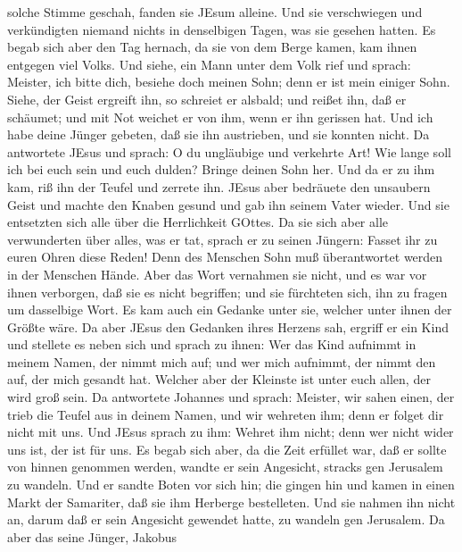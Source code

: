 solche Stimme geschah, fanden sie JEsum alleine. Und sie verschwiegen
und verkündigten niemand nichts in denselbigen Tagen, was sie gesehen
hatten.  Es begab sich aber den Tag hernach, da sie von dem
Berge kamen, kam ihnen entgegen viel Volks.  Und siehe, ein
Mann unter dem Volk rief und sprach: Meister, ich bitte dich, besiehe
doch meinen Sohn; denn er ist mein einiger Sohn.  Siehe,
der Geist ergreift ihn, so schreiet er alsbald; und reißet ihn, daß er
schäumet; und mit Not weichet er von ihm, wenn er ihn gerissen hat.
 Und ich habe deine Jünger gebeten, daß sie ihn austrieben,
und sie konnten nicht.  Da antwortete JEsus und sprach: O
du ungläubige und verkehrte Art! Wie lange soll ich bei euch sein und
euch dulden? Bringe deinen Sohn her.  Und da er zu ihm kam,
riß ihn der Teufel und zerrete ihn. JEsus aber bedräuete den unsaubern
Geist und machte den Knaben gesund und gab ihn seinem Vater wieder.
 Und sie entsetzten sich alle über die Herrlichkeit GOttes.
Da sie sich aber alle verwunderten über alles, was er tat, sprach er zu
seinen Jüngern:  Fasset ihr zu euren Ohren diese Reden!
Denn des Menschen Sohn muß überantwortet werden in der Menschen Hände.
 Aber das Wort vernahmen sie nicht, und es war vor ihnen
verborgen, daß sie es nicht begriffen; und sie fürchteten sich, ihn zu
fragen um dasselbige Wort.  Es kam auch ein Gedanke unter
sie, welcher unter ihnen der Größte wäre.  Da aber JEsus
den Gedanken ihres Herzens sah, ergriff er ein Kind und stellete es
neben sich  und sprach zu ihnen: Wer das Kind aufnimmt in
meinem Namen, der nimmt mich auf; und wer mich aufnimmt, der nimmt den
auf, der mich gesandt hat. Welcher aber der Kleinste ist unter euch
allen, der wird groß sein.  Da antwortete Johannes und
sprach: Meister, wir sahen einen, der trieb die Teufel aus in deinem
Namen, und wir wehreten ihm; denn er folget dir nicht mit uns.
 Und JEsus sprach zu ihm: Wehret ihm nicht; denn wer nicht
wider uns ist, der ist für uns.  Es begab sich aber, da die
Zeit erfüllet war, daß er sollte von hinnen genommen werden, wandte er
sein Angesicht, stracks gen Jerusalem zu wandeln.  Und er
sandte Boten vor sich hin; die gingen hin und kamen in einen Markt der
Samariter, daß sie ihm Herberge bestelleten.  Und sie
nahmen ihn nicht an, darum daß er sein Angesicht gewendet hatte, zu
wandeln gen Jerusalem.  Da aber das seine Jünger, Jakobus
